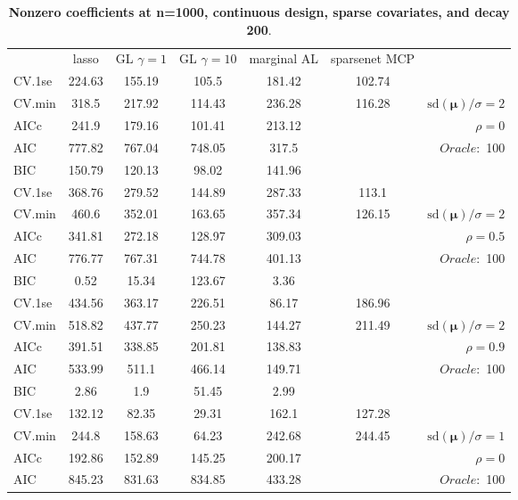 \clearpage
\begin{table}\vspace{-.5cm}
\caption[l]{ { \bf Nonzero coefficients at n=1000, continuous design, 
sparse covariates, and  decay  200}.}
\vspace{-.5cm}
\footnotesize{}
\begin{center}
\begin{tabular}{l*{5}{c}|r}
& lasso & GL $\gamma=1$ & GL $\gamma=10$ & marginal AL & sparsenet MCP  & \\
 \cline{1-7}
CV.1se & 224.63 & 155.19 & 105.5 & 181.42 & 102.74 & \\
CV.min & 318.5 & 217.92 & 114.43 & 236.28 & 116.28 &  $\mathrm{sd}(\mathbf{\mu})/\sigma=2$ \\
AICc & 241.9 & 179.16 & 101.41 & 213.12 & & $\rho=0$ \\
AIC & 777.82 & 767.04 & 748.05 & 317.5 & &  \multirow{2}{*}{$Oracle: $ 100} \\
BIC & 150.79 & 120.13 & 98.02 & 141.96 & &  \\
 \hline 
CV.1se & 368.76 & 279.52 & 144.89 & 287.33 & 113.1 & \\
CV.min & 460.6 & 352.01 & 163.65 & 357.34 & 126.15 &  $\mathrm{sd}(\mathbf{\mu})/\sigma=2$ \\
AICc & 341.81 & 272.18 & 128.97 & 309.03 & & $\rho=0.5$ \\
AIC & 776.77 & 767.31 & 744.78 & 401.13 & &  \multirow{2}{*}{$Oracle: $ 100} \\
BIC & 0.52 & 15.34 & 123.67 & 3.36 & &  \\
 \hline 
CV.1se & 434.56 & 363.17 & 226.51 & 86.17 & 186.96 & \\
CV.min & 518.82 & 437.77 & 250.23 & 144.27 & 211.49 &  $\mathrm{sd}(\mathbf{\mu})/\sigma=2$ \\
AICc & 391.51 & 338.85 & 201.81 & 138.83 & & $\rho=0.9$ \\
AIC & 533.99 & 511.1 & 466.14 & 149.71 & &  \multirow{2}{*}{$Oracle: $ 100} \\
BIC & 2.86 & 1.9 & 51.45 & 2.99 & &  \\
 \hline 
CV.1se & 132.12 & 82.35 & 29.31 & 162.1 & 127.28 & \\
CV.min & 244.8 & 158.63 & 64.23 & 242.68 & 244.45 &  $\mathrm{sd}(\mathbf{\mu})/\sigma=1$ \\
AICc & 192.86 & 152.89 & 145.25 & 200.17 & & $\rho=0$ \\
AIC & 845.23 & 831.63 & 834.85 & 433.28 & &  \multirow{2}{*}{$Oracle: $ 100} \\

\end{tabular}
\end{center}
\end{table}
